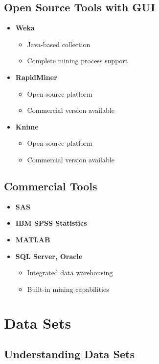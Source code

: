 \section{Open Source Tools with GUI}
\begin{itemize}
    \item \textbf{Weka}
    \begin{itemize}
        \item Java-based collection
        \item Complete mining process support
    \end{itemize}
    
    \item \textbf{RapidMiner}
    \begin{itemize}
        \item Open source platform
        \item Commercial version available
    \end{itemize}
    
    \item \textbf{Knime}
    \begin{itemize}
        \item Open source platform
        \item Commercial version available
    \end{itemize}
\end{itemize}

\section{Commercial Tools}
\begin{itemize}
    \item \textbf{SAS}
    \item \textbf{IBM SPSS Statistics}
    \item \textbf{MATLAB}
    \item \textbf{SQL Server, Oracle}
    \begin{itemize}
        \item Integrated data warehousing
        \item Built-in mining capabilities
    \end{itemize}
\end{itemize}

\chapter{Data Sets}

\section{Understanding Data Sets}

